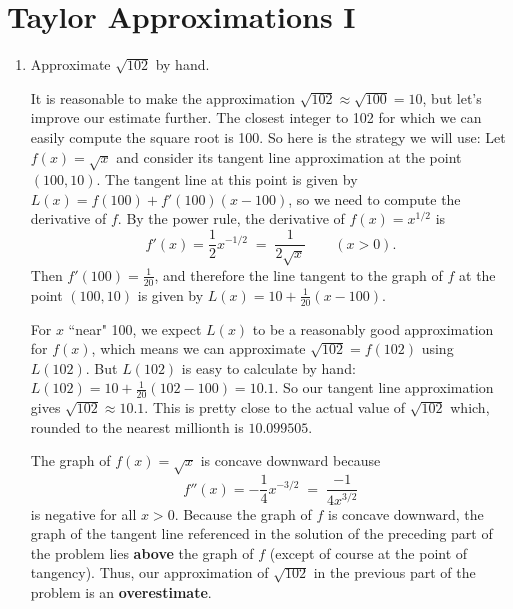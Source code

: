 \documentclass[main]{subfiles}
\begin{document}
\ifSubfilesClassLoaded{%
  \chaptermark{\chaptertwo}
}{}

\section{Taylor Approximations I} \label{ws2-1}


\begin{enumerate}

  \item


  \begin{problem}[1in]
    Approximate $\sqrt{102}$ by hand.  
  \end{problem}

  \begin{solution}
    It is reasonable to make the approximation $\sqrt{102} \approx \sqrt{100} = 10$, but let's improve our estimate further.  The closest integer to 102 for which we can
    easily compute the square root is 100.  So here is the strategy we will use:  Let $f(x) = \sqrt{x}$
    and consider its tangent line approximation at the point $(100, 10)$.  The tangent line at this
    point is given by $L(x) = f(100) + f'(100)(x-100)$, so we need to compute the derivative of $f$.
    By the power rule, the derivative of $f(x) = x^{1/2}$ is
    $$
      f'(x) = \frac{1}{2} x^{-1/2} \; = \; \frac{1}{2 \sqrt{x}} \qquad (x > 0).
    $$
    Then $f'(100) = \frac{1}{20}$, and therefore the line tangent to the graph of $f$ at the point
    $(100,10)$ is given by $L(x) = 10 + \frac{1}{20}(x - 100)$.  

    For $x$ ``near" 100, we expect $L(x)$ to be a reasonably good approximation for $f(x)$, which
    means we can approximate $\sqrt{102} = f(102)$ using $L(102)$.  But $L(102)$ is easy to calculate
    by hand: $L(102) =  10 + \frac{1}{20}(102 - 100) = 10.1$.  So our tangent line approximation gives
    $\sqrt{102} \approx 10.1$.  This is pretty close to the actual value of $\sqrt{102}$ which, rounded
    to the nearest millionth is $10.099505$.    

    The graph of $f(x) = \sqrt{x}$ is concave downward because
    $$
      f''(x) = - \frac{1}{4} x^{-3/2} \; = \; \frac{-1}{4 x^{3/2}}
    $$
    is negative for all $x > 0$.  Because the graph of $f$ is concave downward, 
    the graph of the tangent line referenced in the solution of the preceding
    part of the
    problem lies \textbf{above} the graph of $f$ (except of course at the point of 
    tangency).  Thus, our approximation of $\sqrt{102}$ in the previous 
    part of the problem
    is an {\bf overestimate}.  
 

\end{solution}
\end{enumerate}
\end{document}
